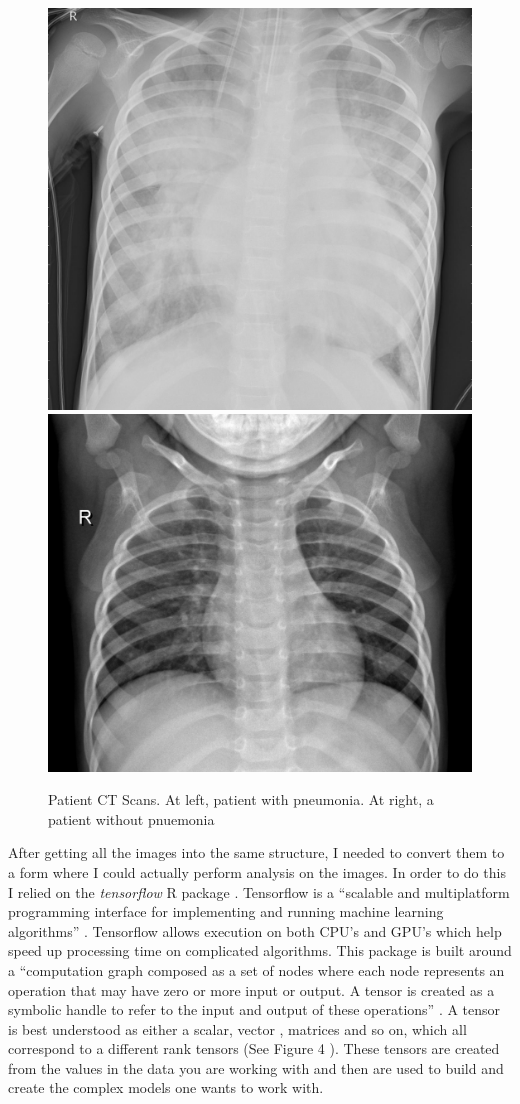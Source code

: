 \documentclass[12pt]{article}
\begin{document}
\begin{figure}
\includegraphics[width=0.49\linewidth,height=0.25\textheight]{images/pneumonia} \includegraphics[width=0.49\linewidth,height=0.25\textheight]{images/normal} \caption{Patient CT Scans. At left, patient with pneumonia. At right, a patient without pnuemonia}\label{fig:sample-fig3}
\end{figure}

After getting all the images into the same structure, I needed to
convert them to a form where I could actually perform analysis on the
images. In order to do this I relied on the \emph{tensorflow} R package
\citet{Tensorflow2}. Tensorflow is a ``scalable and multiplatform
programming interface for implementing and running machine learning
algorithms'' \citet{PML}. Tensorflow allows execution on both CPU's and
GPU's which help speed up processing time on complicated algorithms.
This package is built around a ``computation graph composed as a set of
nodes where each node represents an operation that may have zero or more
input or output. A tensor is created as a symbolic handle to refer to
the input and output of these operations'' \citet{PML}. A tensor is best
understood as either a scalar, vector , matrices and so on, which all
correspond to a different rank tensors (See Figure 4 \citet{PML}). These
tensors are created from the values in the data you are working with and
then are used to build and create the complex models one wants to work
with.
\end{document}
